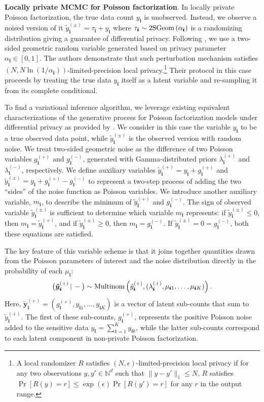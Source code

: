 \documentclass{article}
\newcommand{\subs}{\pmb{i}}
\newcommand{\wsup}[2]{#1_{\subs}^{(#2)}}
\newcommand{\ytP}{\wsup{\tilde{y}}{+}}
\newcommand{\ytPM}{\wsup{\tilde{y}}{\pm}}
\newcommand{\ysk}{y_{\subs k}}
\newcommand{\ys}{y_{\subs}}
\newcommand{\taus}{\tau_{\subs}}
\newcommand{\lamP}{\wsup{\lambda}{+}}
\newcommand{\lamM}{\wsup{\lambda}{-}}
\newcommand{\gP}{\wsup{g}{+}}
\newcommand{\gM}{\wsup{g}{-}}
\newcommand{\mus}{\mu_{\subs}}
\newcommand{\ms}{m_{\subs}}
\newcommand{\yvtP}{\boldsymbol{\tilde{y}}_{\subs}^{(+)}}
\newcommand{\Multi}[1]{\textup{Multinom}\left( #1 \right)}
\newcommand{\Geo}[1]{\textup{2SGeom}\left( #1 \right)}
\newcommand{\given}{\,|\,}
\newcommand{\compcond}[1]{\big(#1\given-\big)}
\begin{document}
  \textbf{Locally private MCMC for Poisson factorization}. In locally private
  Poisson factorization, the true data count $\ys$ is unobserved. Instead, we
  observe a noised version of it $\ytPM = \taus + \ys$ where $\taus \sim
  \Geo{\alpha_{\subs}}$ is a randomizing distribution giving a guarantee of
  differential privacy. Following \cite{schein2018locally}, we use a two-sided
  geometric random variable generated based on privacy parameter $\alpha_{\subs} \in [0,1]$.
  The authors demonstrate that such perturbation mechanism satisfies $(N, N
  \ln(1/\alpha_{\subs}))$-limited-precision local privacy.\footnote{A local
  randomizer $R$ satisfies $(N, \epsilon)$-limited-precision local privacy if
  for any two observations $y,y'\in \mathbb{N}^d$ such that $\|y-y'\|_1\leq N$,
  $R$ satisfies $\Pr[R(y) = r] \leq \exp(\epsilon)\Pr[R(y') = r]$ for any $r$ in
  the output range.} Their protocol in this case proceeds by treating the true data $\ys$
  itself as a latent variable and re-sampling it from its complete conditional.

  To find a variational inference algorithm, we leverage existing equivalent
  characterizations of the generative process for Poisson factorization models
  under differential privacy as provided by \citep{schein2018locally}. We
  consider in this case the variable $\ys$ to be a true observed data point,
  while $\ytPM$ is the observed version with random noise. We treat two-sided
  geometric noise as the difference of two Poisson variables $\gP$ and $\gM$,
  generated with Gamma-distributed priors $\lamP$ and $\lamM$, respectively. We
  define auxiliary variables $\ytP = \ys + \gP$ and $\ytPM = \ys + \gP - \gM$ to
  represent a two-step process of adding the two ``sides'' of the noise function
  as Poisson variables. We introduce another auxiliary variable, $\ms$, to
  describe the minimum of $\ytP$ and $\gM$. The sign of observed variable
  $\ytPM$ is sufficient to determine which variable $\ms$ represents: if $\ytPM
  \leq 0$, then $\ms = \ytP$, and if $\ytPM \geq 0$, then $\ms = \gM$. If $\ytPM
  = 0 = \gM$, both these equations are satisfied.

  The key feature of this variable scheme is that it joins together quantities drawn from
  the Poisson parameters of interest and the noise
  distribution directly in the probability of each $\mus$:
  \begin{equation}
    \compcond{\yvtP} \sim \Multi{\ytP, (\lamP, \mu_{\subs 1}, \dots, \mu_{\subs K})}.
  \end{equation} 
  Here, $\yvtP=(\gP, y_{\subs 1}, \dots, y_{\subs K})$ is a vector of latent
  sub-counts that sum to $\ytP$. The first of these sub-counts, $\gP$, represents
  the positive Poisson noise added to the sensitive data $\ys=\sum_{k=1}^K \ysk$,
  while the latter sub-counts correspond to each latent component in non-private
  Poisson factorization.
\end{document}
